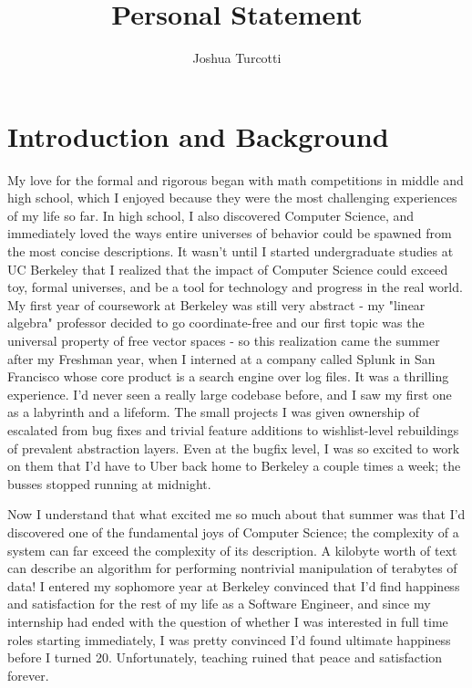 \documentclass{nsf-grfp}
\title{Personal Statement}
\author{Joshua Turcotti}
\begin{document}
\maketitle
{}

\section*{Introduction and Background}

My love for the formal and rigorous began with math competitions in middle and high school, which I enjoyed because they were the most challenging experiences of my life so far. In high school, I also discovered Computer Science, and immediately loved the ways entire universes of behavior could be spawned from the most concise descriptions. It wasn't until I started undergraduate studies at UC Berkeley that I realized that the impact of Computer Science could exceed toy, formal universes, and be a tool for technology and progress in the real world. My first year of coursework at Berkeley was still very abstract - my "linear algebra" professor decided to go coordinate-free and our first topic was the universal property of free vector spaces - so this realization came the summer after my Freshman year, when I interned at a company called Splunk in San Francisco whose core product is a search engine over log files. It was a thrilling experience. I'd never seen a really large codebase before, and I saw my first one as a labyrinth and a lifeform. The small projects I was given ownership of escalated from bug fixes and trivial feature additions to wishlist-level rebuildings of prevalent abstraction layers. Even at the bugfix level, I was so excited to work on them that I'd have to Uber back home to Berkeley a couple times a week; the busses stopped running at midnight. 

Now I understand that what excited me so much about that summer was that I'd discovered one of the fundamental joys of Computer Science; the complexity of a system can far exceed the complexity of its description. A kilobyte worth of text can describe an algorithm for performing nontrivial manipulation of terabytes of data! I entered my sophomore year at Berkeley convinced that I'd find happiness and satisfaction for the rest of my life as a Software Engineer, and since my internship had ended with the question of whether I was interested in full time roles starting immediately, I was pretty convinced I'd found ultimate happiness before I turned 20. Unfortunately, teaching ruined that peace and satisfaction forever.
\end{document}
